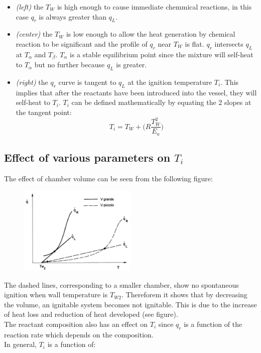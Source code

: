 \documentclass[12pt]{article}
\begin{document}
\begin{itemize}
    \item \textit{(left)} the $T_{W}$ is high enough to cause immediate chemmical reactions, in this case $q_{r}$ is always greater than $q_{L}$.
    \item \textit{(center)} the $T_{W}$ is low enough to allow the heat generation by chemical reaction to be significant and the profile of $q_{r}$ near $T_{W}$ is flat. $q_{r}$ intersects $q_{L}$ at $T_{\alpha}$ and $T_{\beta}$. $T_{\alpha}$ is a stable equilibrium point since the mixture will self-heat to $T_{\alpha}$ but no further because $q_{L}$ is greater.
    \item \textit{(right)} the $q_{r}$ curve is tangent to $q_{L}$ at the ignition temperature $T_{i}$. This implies that after the reactants have been introduced into the vessel, they will self-heat to $T_{i}$. $T_{i}$ can be defined mathematically by equating the 2 slopes at the tangent point:
    \begin{equation}
        T_{i}=T_{W}+\bigg(R\frac{T_{W}^{2}}{E_{a}}\bigg)
    \end{equation}
\end{itemize}

\subsection{Effect of various parameters on $T_{i}$}

The effect of chamber volume can be seen from the following figure:

\begin{figure}[h!]
\centering
\includegraphics[width=0.5\textwidth]{figures/dashed.png}
\end{figure}

The dashed lines, corresponding to a smaller chamber, show no spontaneous ignition when wall temperature is $T_{W2}$. Thereforem it shows that by decreasing the volume, an ignitable system becomes not ignitable. This is due to the increase of heat loss and reduction of heat developed (see figure).\\
The reactant composition also has an effect on $T_{i}$ since $q_{r}$ is a function of the reaction rate which depends on the composition.\\
In general, $T_{i}$ is a function of:
\end{document}

